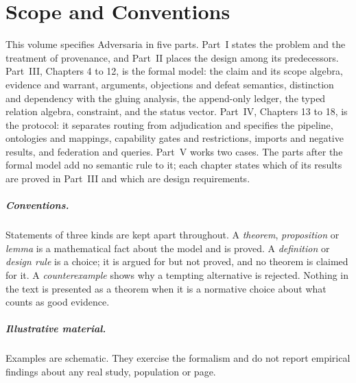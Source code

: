 \chapter*{Scope and Conventions}

This volume specifies Adversaria in five parts. Part~I states the problem and the treatment of provenance, and Part~II places the design among its predecessors. Part~III, Chapters 4 to 12, is the formal model: the claim and its scope algebra, evidence and warrant, arguments, objections and defeat semantics, distinction and dependency with the gluing analysis, the append-only ledger, the typed relation algebra, constraint, and the status vector. Part~IV, Chapters 13 to 18, is the protocol: it separates routing from adjudication and specifies the pipeline, ontologies and mappings, capability gates and restrictions, imports and negative results, and federation and queries. Part~V works two cases. The parts after the formal model add no semantic rule to it; each chapter states which of its results are proved in Part~III and which are design requirements.

\paragraph{Conventions.} Statements of three kinds are kept apart throughout. A \emph{theorem}, \emph{proposition} or \emph{lemma} is a mathematical fact about the model and is proved. A \emph{definition} or \emph{design rule} is a choice; it is argued for but not proved, and no theorem is claimed for it. A \emph{counterexample} shows why a tempting alternative is rejected. Nothing in the text is presented as a theorem when it is a normative choice about what counts as good evidence.

\paragraph{Illustrative material.} Examples are schematic. They exercise the formalism and do not report empirical findings about any real study, population or page.
